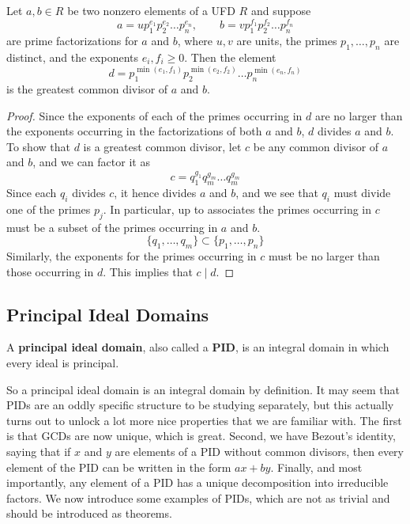   \begin{theorem}
    Let $a, b \in R$ be two nonzero elements of a UFD $R$ and suppose 
    \begin{equation}
      a = u p_1^{e_1} p_2^{e_2} \ldots  p_n^{e_n}, \qquad b = v p_1^{f_1} p_2^{f_2} \ldots p_n^{f_n}
    \end{equation}
    are prime factorizations for $a$ and $b$, where $u, v$ are units, the primes $p_1, \ldots, p_n$ are distinct, and the exponents $e_i, f_i \geq 0$. Then the element 
    \begin{equation}
      d = p_1^{\min(e_1, f_1)} p_2^{\min(e_2, f_2)} \ldots p_n^{\min(e_n, f_n)}
    \end{equation}
    is the greatest common divisor of $a$ and $b$. 
  \end{theorem}
  \begin{proof}
    Since the exponents of each of the primes occurring in $d$ are no larger than the exponents occurring in the factorizations of both $a$ and $b$, $d$ divides $a$ and $b$. To show that $d$ is a greatest common divisor, let $c$ be any common divisor of $a$ and $b$, and we can factor it as 
    \begin{equation}
      c = q_1^{g_1} q_m^{g_m} \ldots q_m^{g_m}
    \end{equation}
    Since each $q_i$ divides $c$, it hence divides $a$ and $b$, and we see that $q_i$ must divide one of the primes $p_j$. In particular, up to associates the primes occurring in $c$ must be a subset of the primes occurring in $a$ and $b$. 
    \begin{equation}
      \{q_1, \ldots, q_m\} \subset \{p_1, \ldots, p_n\}
    \end{equation}
    Similarly, the exponents for the primes occurring in $c$ must be no larger than those occurring in $d$. This implies that $c \mid d$. 
  \end{proof}

\subsection{Principal Ideal Domains}

  \begin{definition}
    A \textbf{principal ideal domain}, also called a \textbf{PID}, is an integral domain in which every ideal is principal.  
  \end{definition}

  So a principal ideal domain is an integral domain by definition. It may seem that PIDs are an oddly specific structure to be studying separately, but this actually turns out to unlock a lot more nice properties that we are familiar with. The first is that GCDs are now unique, which is great. Second, we have Bezout's identity, saying that if $x$ and $y$ are elements of a PID without common divisors, then every element of the PID can be written in the form $a x + b y$. Finally, and most importantly, any element of a PID has a unique decomposition into irreducible factors. We now introduce some examples of PIDs, which are not as trivial and should be introduced as theorems. 

